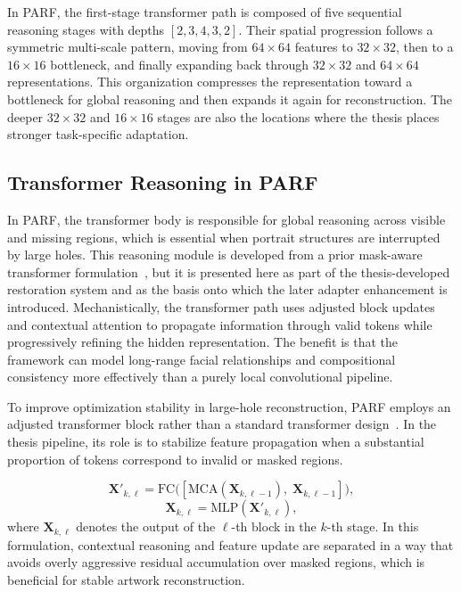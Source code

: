 \documentclass[12pt, twoside]{report}
\begin{document}
In PARF, the first-stage transformer path is composed of five sequential reasoning stages with depths $[2,3,4,3,2]$. Their spatial progression follows a symmetric multi-scale pattern, moving from $64\times64$ features to $32\times32$, then to a $16\times16$ bottleneck, and finally expanding back through $32\times32$ and $64\times64$ representations. This organization compresses the representation toward a bottleneck for global reasoning and then expands it again for reconstruction. The deeper $32\times32$ and $16\times16$ stages are also the locations where the thesis places stronger task-specific adaptation.

\subsection{Transformer Reasoning in PARF}

In PARF, the transformer body is responsible for global reasoning across visible and missing regions, which is essential when portrait structures are interrupted by large holes. This reasoning module is developed from a prior mask-aware transformer formulation~\cite{li2022mat}, but it is presented here as part of the thesis-developed restoration system and as the basis onto which the later adapter enhancement is introduced. Mechanistically, the transformer path uses adjusted block updates and contextual attention to propagate information through valid tokens while progressively refining the hidden representation. The benefit is that the framework can model long-range facial relationships and compositional consistency more effectively than a purely local convolutional pipeline.

To improve optimization stability in large-hole reconstruction, PARF employs an adjusted transformer block rather than a standard transformer design~\cite{li2022mat}. In the thesis pipeline, its role is to stabilize feature propagation when a substantial proportion of tokens correspond to invalid or masked regions.

\begin{equation}
\mathbf{X}'_{k,\ell} = \mathrm{FC}\big([\mathrm{MCA}(\mathbf{X}_{k,\ell-1}),\; \mathbf{X}_{k,\ell-1}]\big),
\end{equation}
\begin{equation}
\mathbf{X}_{k,\ell} = \mathrm{MLP}(\mathbf{X}'_{k,\ell}),
\end{equation}
where $\mathbf{X}_{k,\ell}$ denotes the output of the $\ell$-th block in the $k$-th stage. In this formulation, contextual reasoning and feature update are separated in a way that avoids overly aggressive residual accumulation over masked regions, which is beneficial for stable artwork reconstruction.
\end{document}
